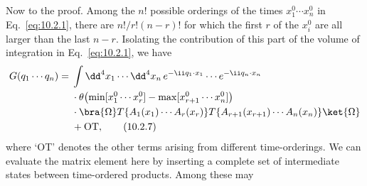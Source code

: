 Now to the proof. Among the $n!$ possible orderings of the times $x_1^0\cdots x_n^0$
in Eq.~\eqref{eq:10.2.1}, there are $n!/r!(n-r)!$ for which the first $r$ of the $x_i^0$ are
all larger than the last $n-r$. Isolating the contribution of this part of the
volume of integration in Eq.~\eqref{eq:10.2.1}, we have
\begin{align}
  G(q_1\cdots q_n)={}&\int \dd^4x_1\cdots \dd^4x_n\,
  e^{-\ii q_1\cdot x_1}\cdots e^{-\ii q_n\cdot x_n}
  \notag\\
  &\cdot\theta\!\left(\min[x_1^0\cdots x_r^0]
  -\max[x_{r+1}^0\cdots x_n^0]\right)
  \notag\\
  &\cdot\bra{\Omega}T\{A_1(x_1)\cdots A_r(x_r)\}
  T\{A_{r+1}(x_{r+1})\cdots A_n(x_n)\}\ket{\Omega}
  \notag\\
  &+\mathrm{OT},
  \tag{10.2.7}\label{eq:10.2.7}
\end{align}
where `OT' denotes the other terms arising from different time-orderings.
We can evaluate the matrix element here by inserting a complete set of
intermediate states between time-ordered products. Among these may




